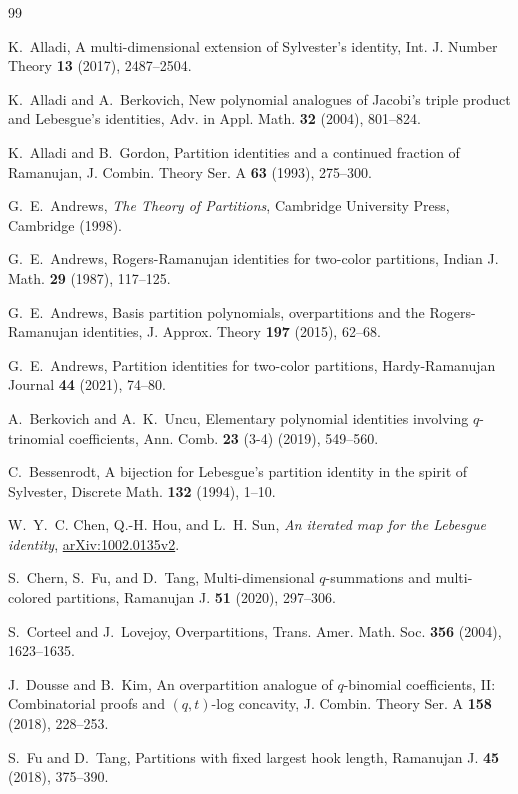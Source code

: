 \documentclass[11pt,reqno]{amsart}
\numberwithin{equation}{section}
\theoremstyle{plain}
\theoremstyle{definition}
\begin{document}
\begin{thebibliography}{99}

 K.~Alladi, A multi-dimensional extension of Sylvester's identity, Int. J. Number Theory {\bf 13} (2017), 2487--2504.

 K.~Alladi and A.~Berkovich, New polynomial analogues of Jacobi's triple product and Lebesgue's identities, Adv. in Appl. Math. {\bf 32} (2004), 801--824.

 K.~Alladi and B.~Gordon, Partition identities and a continued fraction of Ramanujan, J. Combin. Theory Ser. A {\bf 63} (1993), 275--300.

 G.~E.~Andrews, {\it The Theory of Partitions}, Cambridge University Press, Cambridge (1998).

 G.~E.~Andrews, Rogers-Ramanujan identities for two-color partitions, Indian J. Math. {\bf 29} (1987), 117--125.

 G.~E.~Andrews, Basis partition polynomials, overpartitions and the Rogers-Ramanujan identities, J. Approx. Theory {\bf 197} (2015), 62--68.

 G.~E.~Andrews, Partition identities for two-color partitions, Hardy-Ramanujan Journal {\bf 44} (2021), 74--80.

 A.~Berkovich and A.~K.~Uncu, Elementary polynomial identities involving $q$-trinomial coefficients, Ann. Comb. {\bf 23} (3-4) (2019), 549--560.

 C.~Bessenrodt, A bijection for Lebesgue's partition identity in the spirit of Sylvester, Discrete Math. {\bf 132} (1994), 1--10.

 W.~Y.~C. Chen, Q.-H. Hou, and L.~H. Sun, {\it An iterated map for the Lebesgue identity}, \href{https://arxiv.org/abs/1002.0135}{arXiv:1002.0135v2}.

 S.~Chern, S.~Fu, and D.~Tang, Multi-dimensional $q$-summations and multi-colored partitions, Ramanujan J. {\bf 51} (2020), 297--306.

 S.~Corteel and J.~Lovejoy, Overpartitions, Trans. Amer. Math. Soc. {\bf 356} (2004), 1623--1635.

 J.~Dousse and B.~Kim, An overpartition analogue of $q$-binomial coefficients, II: Combinatorial proofs and $(q,t)$-log concavity, J. Combin. Theory Ser. A {\bf 158} (2018), 228--253.

 S.~Fu and D.~Tang, Partitions with fixed largest hook length, Ramanujan J. {\bf 45} (2018), 375--390.


\end{thebibliography}
\end{document}
